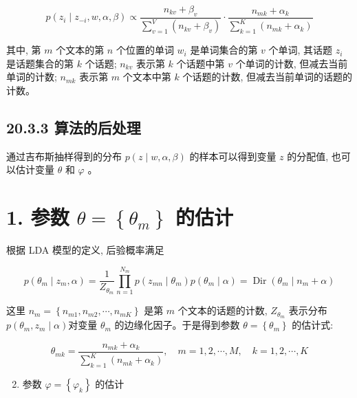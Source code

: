 \documentclass[10pt]{article}
\begin{document}
\begin{CJK*}{UTF8}{bsmi}
\begin{equation*}
p\left(z_{i} \mid z_{-i}, w, \alpha, \beta\right) \propto \frac{n_{k v}+\beta_{v}}{\sum_{v=1}^{V}\left(n_{k v}+\beta_{v}\right)} \cdot \frac{n_{m k}+\alpha_{k}}{\sum_{k=1}^{K}\left(n_{m k}+\alpha_{k}\right)} \tag{20.29}
\end{equation*}


其中, 第 $m$ 个文本的第 $n$ 个位置的单词 $w_{i}$ 是单词集合的第 $v$ 个单词, 其话题 $z_{i}$ 是话题集合的第 $k$ 个话题; $n_{k v}$ 表示第 $k$ 个话题中第 $v$ 个单词的计数, 但减去当前单词的计数; $n_{m k}$ 表示第 $m$ 个文本中第 $k$ 个话题的计数, 但减去当前单词的话题的计数。

\subsection*{20.3.3 算法的后处理}
通过吉布斯抽样得到的分布 $p(z \mid w, \alpha, \beta)$ 的样本可以得到变量 $z$ 的分配值, 也可以估计变量 $\theta$ 和 $\varphi$ 。

\section*{1. 参数 $\theta=\left\{\theta_{m}\right\}$ 的估计}
根据 LDA 模型的定义, 后验概率满足


\begin{equation*}
p\left(\theta_{m} \mid z_{m}, \alpha\right)=\frac{1}{Z_{\theta_{m}}} \prod_{n=1}^{N_{m}} p\left(z_{m n} \mid \theta_{m}\right) p\left(\theta_{m} \mid \alpha\right)=\operatorname{Dir}\left(\theta_{m} \mid n_{m}+\alpha\right) \tag{20.30}
\end{equation*}


这里 $n_{m}=\left\{n_{m 1}, n_{m 2}, \cdots, n_{m K}\right\}$ 是第 $m$ 个文本的话题的计数, $Z_{\theta_{m}}$ 表示分布 $p\left(\theta_{m}, z_{m} \mid \alpha\right)$对变量 $\theta_{m}$ 的边缘化因子。于是得到参数 $\theta=\left\{\theta_{m}\right\}$ 的估计式:


\begin{equation*}
\theta_{m k}=\frac{n_{m k}+\alpha_{k}}{\sum_{k=1}^{K}\left(n_{m k}+\alpha_{k}\right)}, \quad m=1,2, \cdots, M, \quad k=1,2, \cdots, K \tag{20.31}
\end{equation*}


\begin{enumerate}
  \setcounter{enumi}{1}
  \item 参数 $\varphi=\left\{\varphi_{k}\right\}$ 的估计
\end{enumerate}


\end{CJK*}
\end{document}
